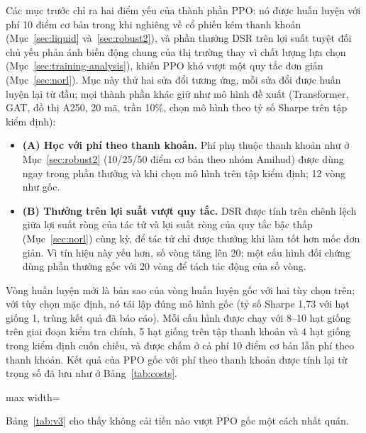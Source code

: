 Các mục trước chỉ ra hai điểm yếu của thành phần PPO: nó được huấn luyện với phí 10 điểm cơ bản trong khi nghiêng về cổ phiếu kém thanh khoản (Mục~\ref{sec:liquid} và~\ref{sec:robust2}), và phần thưởng DSR trên lợi suất tuyệt đối chủ yếu phản ánh biến động chung của thị trường thay vì chất lượng lựa chọn (Mục~\ref{sec:training-analysis}), khiến PPO khó vượt một quy tắc đơn giản (Mục~\ref{sec:norl}). Mục này thử hai sửa đổi tương ứng, mỗi sửa đổi được huấn luyện lại từ đầu; mọi thành phần khác giữ như mô hình đề xuất (Transformer, GAT, đồ thị A250, 20 mã, trần 10\%, chọn mô hình theo tỷ số Sharpe trên tập kiểm định):
\begin{itemize}
  \item \textbf{(A) Học với phí theo thanh khoản.} Phí phụ thuộc thanh khoản như ở Mục~\ref{sec:robust2} (10/25/50 điểm cơ bản theo nhóm Amihud) được dùng ngay trong phần thưởng và khi chọn mô hình trên tập kiểm định; 12 vòng như gốc.
  \item \textbf{(B) Thưởng trên lợi suất vượt quy tắc.} DSR được tính trên chênh lệch giữa lợi suất ròng của tác tử và lợi suất ròng của quy tắc bậc thấp (Mục~\ref{sec:norl}) cùng kỳ, để tác tử chỉ được thưởng khi làm tốt hơn mốc đơn giản. Vì tín hiệu này yếu hơn, số vòng tăng lên 20; một cấu hình đối chứng dùng phần thưởng gốc với 20 vòng để tách tác động của số vòng.
\end{itemize}
Vòng huấn luyện mới là bản sao của vòng huấn luyện gốc với hai tùy chọn trên; với tùy chọn mặc định, nó tái lập đúng mô hình gốc (tỷ số Sharpe 1,73 với hạt giống 1, trùng kết quả đã báo cáo). Mỗi cấu hình được chạy với 8--10 hạt giống trên giai đoạn kiểm tra chính, 5 hạt giống trên tập thanh khoản và 4 hạt giống trong kiểm định cuốn chiếu, và được chấm ở cả phí 10 điểm cơ bản lẫn phí theo thanh khoản. Kết quả của PPO gốc với phí theo thanh khoản được tính lại từ trọng số đã lưu như ở Bảng~\ref{tab:costs}.

\begin{table}[ht]
\centering\footnotesize
\setlength{\tabcolsep}{3pt}
\caption{Tỷ số Sharpe (trung bình $\pm$ độ lệch chuẩn qua các hạt giống) của hai cải tiến so với PPO gốc, ở phí 10 điểm cơ bản và phí theo thanh khoản (TK)}
\label{tab:v3}
\begin{adjustbox}{max width=\textwidth}\end{adjustbox}
\end{table}

Bảng~\ref{tab:v3} cho thấy không cải tiến nào vượt PPO gốc một cách nhất quán.

